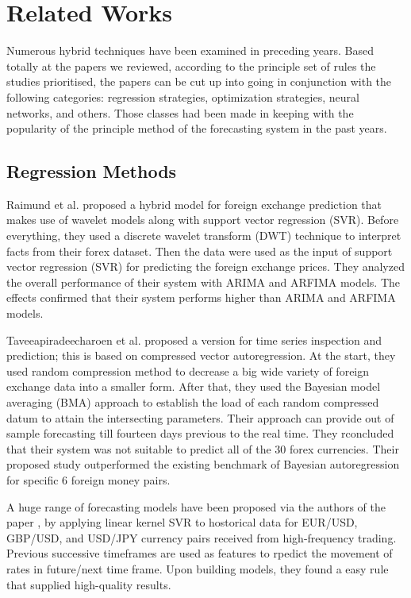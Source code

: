 \section{Related Works}

Numerous hybrid techniques have been examined in preceding years. Based totally at the papers we reviewed, according to the principle set of rules the studies prioritised, the papers can be cut up into going in conjunction with the following categories: regression strategies, optimization strategies, neural networks, and others. Those classes had been made in keeping with the popularity of the principle method of the forecasting system in the past years.

\subsection{Regression Methods}

Raimund et al. \cite{Raimundo18} proposed a hybrid model for foreign exchange prediction that makes use of wavelet models along with support vector regression (SVR). Before everything, they used a discrete wavelet transform (DWT) technique to interpret facts from their forex dataset. Then the data were used as the input of support vector regression (SVR) for predicting the foreign exchange prices. They analyzed the overall performance of their system with ARIMA and ARFIMA models. The effects confirmed that their system performs higher than ARIMA and ARFIMA models. 

Taveeapiradeecharoen et al. \citep{Taveeapiradeecharoen19} proposed a version for time series inspection and prediction; this is based on compressed vector autoregression. At the start, they used random compression method to decrease a big wide variety of foreign exchange data into a smaller form. After that, they used the Bayesian model averaging (BMA) approach to establish the load of each random compressed datum to attain the intersecting parameters. Their approach can provide out of sample forecasting till fourteen days previous to the real time. They rconcluded that their system was not suitable to predict all of the 30 forex currencies. Their proposed study outperformed the existing benchmark of Bayesian autoregression for specific 6 foreign money pairs. 

A huge range of forecasting models have been proposed via the authors of the paper \cite{Serjam18}, by  applying linear kernel SVR to hostorical data for EUR/USD, GBP/USD, and USD/JPY currency pairs received from high-frequency trading. Previous successive timeframes are used as features to rpedict the movement of rates in future/next time frame. Upon building models, they found a easy rule that supplied high-quality results.

